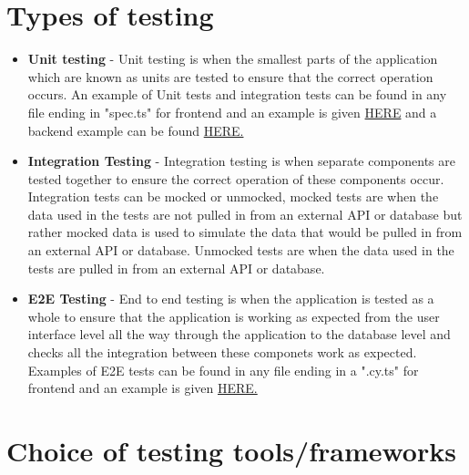 \documentclass[12pt]{article}
\begin{document}
\newpage
\section{Types of testing}
\begin{itemize}
    \item \textbf{Unit testing} - Unit testing is when the smallest parts of the application which are known as units are tested to ensure that the correct operation occurs. An example of Unit tests and integration tests can be found in any file ending in "spec.ts" for frontend and an example is given \href {https://github.com/COS301-SE-2023/Domain-Pulse-A-Sentiment-Analysis-Platform/blob/dev/frontend/src/app/main/main.component.spec.ts}{HERE} and a backend example can be found \href {https://github.com/COS301-SE-2023/Domain-Pulse-A-Sentiment-Analysis-Platform/blob/main/backend/engine/analyser/tests.py}{HERE.}
    \item \textbf{Integration Testing} - Integration testing is when separate components are tested together to ensure the correct operation of these components occur. Integration tests can be mocked or unmocked, mocked tests are when the data used in the tests are not pulled in from an external API or database but rather mocked data is used to simulate the data that would be pulled in from an external API or database. Unmocked tests are when the data used in the tests are pulled in from an external API or database.
    \item \textbf{E2E Testing} - End to end testing is when the application is tested as a whole to ensure that the application is working as expected from the user interface level all the way through the application to the database level and checks all the integration between these componets work as expected. Examples of E2E tests can be found in any file ending in a ".cy.ts" for frontend and an example is given \href {https://github.com/COS301-SE-2023/Domain-Pulse-A-Sentiment-Analysis-Platform/blob/main/frontend/cypress/e2e/accountsManage.cy.ts}{HERE.}
\end{itemize}
\newpage
\section{Choice of testing tools/frameworks}
\end{document}

